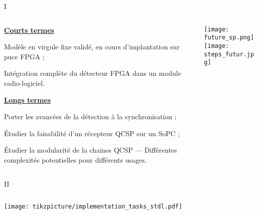 \documentclass[../main.tex]{subfiles}
\begin{document}
\begin{frame}{\subsecname{} I}
  \begin{columns}
    \begin{column}{.7 \linewidth}
      {\centering \underline{\textbf{Courts termes}}\par}
      \begin{ctrlitemize}{.6 em}
        \item Modèle en virgule fixe validé, en cours d'implantation sur puce FPGA ;
        \item Intégration complète du détecteur FPGA dans un module radio-logiciel.
      \end{ctrlitemize}

      {\centering \underline{\textbf{Longs termes}}\par}
      \begin{ctrlitemize}{.6 em}
        \item Porter les avancées de la détection à la synchronisation ;
        \item Étudier la faisabilité d'un récepteur QCSP sur un SoPC ;
        \item Étudier la modularité de la chaines QCSP --- Différentes complexités potentielles pour différents usages.
      \end{ctrlitemize}
    \end{column}
    \begin{column}{.3 \linewidth}
      \hfill \texttt{[image: future\_sp.png]} \\
      \texttt{[image: steps\_futur.jpg]}
    \end{column}
  \end{columns}
\end{frame}

\begin{frame}{\subsecname{} II}
  \begin{columns}
    \begin{column}{.9 \linewidth}
      \centering
      \texttt{[image: tikzpicture/implementation\_tasks\_stdl.pdf]}
    \end{column}
  \end{columns}
\end{frame}
\end{document}
